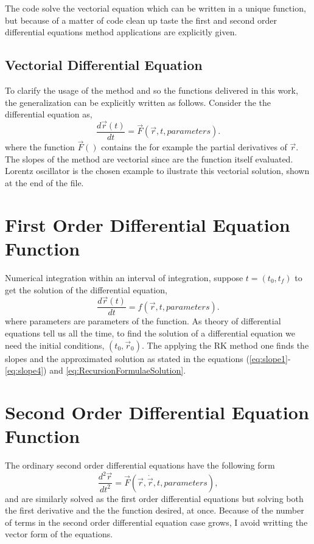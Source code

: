 \documentclass[12pt]{article}
\begin{document}
The code solve the vectorial equation which can be written in a unique
function, but because of a matter of code clean up taste the first and
second order differential equations method applications are explicitly
given.

\subsection{Vectorial Differential Equation}
\label{sec:VectorialDE}

To clarify the usage of the method and so the functions
delivered in this work, the generalization can be explicitly
written as follows. Consider the the differential equation as,
\begin{equation}
  \label{eq:DiffEq}
  \frac{d\vec{r}(t)}{dt} = \vec{F}(\vec{r},t,parameters).
\end{equation}
where the function \(\vec{F}()\) contains the for example the partial
derivatives of \(\vec{r}\). The slopes of the method are vectorial
since are the function itself evaluated. Lorentz oscillator is the
chosen example to ilustrate this vectorial solution, shown at the end
of the file.

\section{First Order Differential Equation Function}
\label{sec:FODE}

Numerical integration within an interval of integration, suppose
\(t=(t_{0},t_{f})\) to get the solution of the differential equation,
\begin{equation}
  \label{eq:DiffEq}
  \frac{d\vec{r}(t)}{dt}=f(\vec{r},t,parameters).
\end{equation}
where parameters are parameters of the function. As theory of
differential equations tell us all the time, to find the solution of a
differential equation we need the initial conditions,
\((t_{0},\vec{r}_{0})\). The applying the RK method one finds the
slopes and the approximated solution as stated in the equations
(\eqref{eq:slope1}-\eqref{eq:slope4}) and
\eqref{eq:RecursionFormulaeSolution}.

\section{Second Order Differential Equation Function}
\label{sec:SecondODEFunction}

The ordinary second order differential equations have the following form
\begin{equation}
  \label{eq:SecondODE}
  \frac{d^{2}\vec{r}}{dt^{2}} = \vec{F}(\vec{r},\dot{\vec{r}},t,parameters),
\end{equation}
and are similarly solved as the first order differential equations but
solving both the first derivative and the the function desired, at
once. Because of the number of terms in the second order 
differential equation case grows, I avoid writting the vector form of the
equations.
\end{document}
